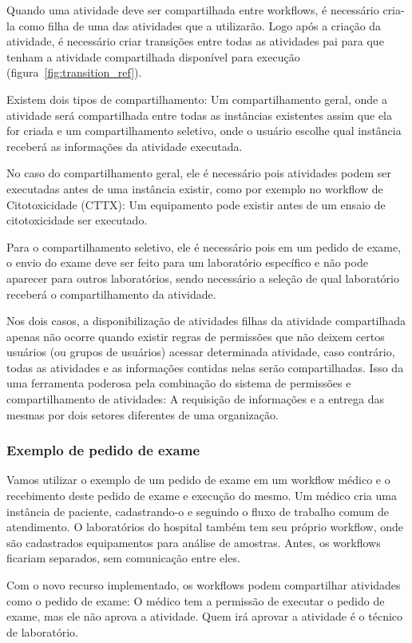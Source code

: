 Quando uma atividade deve ser compartilhada entre workflows, é necessário cria-la como filha de uma das atividades que a utilizarão. Logo após a criação da atividade, é necessário criar transições entre todas as atividades pai para que tenham a atividade compartilhada disponível para execução (figura~\ref{fig:transition_ref}).

Existem dois tipos de compartilhamento: Um compartilhamento geral, onde a atividade será compartilhada entre todas as instâncias existentes assim que ela for criada e um compartilhamento seletivo, onde o usuário escolhe qual instância receberá as informações da atividade executada.

No caso do compartilhamento geral, ele é necessário pois atividades podem ser executadas antes de uma instância existir, como por exemplo no workflow de Citotoxicidade (CTTX): Um equipamento pode existir antes de um ensaio de citotoxicidade ser executado.

Para o compartilhamento seletivo, ele é necessário pois em um pedido de exame, o envio do exame deve ser feito para um laboratório específico e não pode aparecer para outros laboratórios, sendo necessário a seleção de qual laboratório receberá o compartilhamento da atividade.

Nos dois casos, a disponibilização de atividades filhas da atividade compartilhada apenas não ocorre quando existir regras de permissões que não deixem certos usuários (ou grupos de usuários) acessar determinada atividade, caso contrário, todas as atividades e as informações contidas nelas serão compartilhadas.
Isso da uma ferramenta poderosa pela combinação do sistema de permissões e compartilhamento de atividades: A requisição de informações e a entrega das mesmas por dois setores diferentes de uma organização.

\subsubsection{Exemplo de pedido de exame}

Vamos utilizar o exemplo de um pedido de exame em um workflow médico e o recebimento deste pedido de exame e execução do mesmo.
Um médico cria uma instância de paciente, cadastrando-o e seguindo o fluxo de trabalho comum de atendimento.
O laboratórios do hospital também tem seu próprio workflow, onde são cadastrados equipamentos para análise de amostras.
Antes, os workflows ficariam separados, sem comunicação entre eles.

Com o novo recurso implementado, os workflows podem compartilhar atividades como o pedido de exame: O médico tem a permissão de executar o pedido de exame, mas ele não aprova a atividade. Quem irá aprovar a atividade é o técnico de laboratório.

